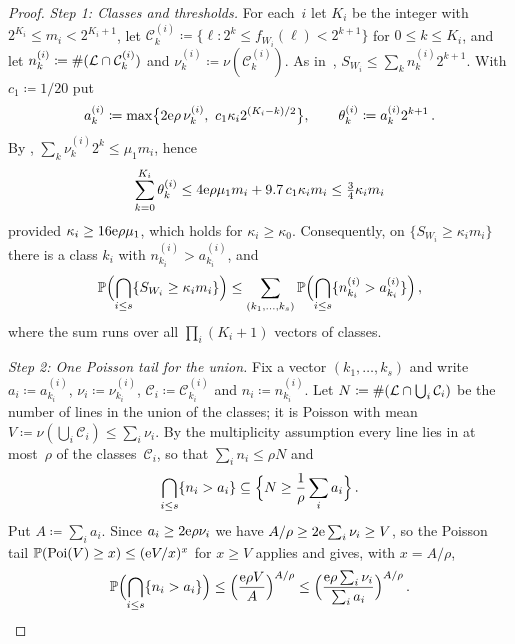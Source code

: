 \documentclass[11pt,letterpaper]{article}
\begin{document}
\begin{proof}
\emph{Step 1: Classes and thresholds.} For each~$i$ let $K_i$ be the integer with $2^{K_i}\le m_i<2^{K_i+1}$, let $\mathcal C^{(i)}_k\coloneqq\{\ell\colon2^k\le f_{W_i}(\ell)<2^{k+1}\}$ for $0\le k\le K_i$, and let $n^{(i)}_k\coloneqq\#(\cL\cap\mathcal C^{(i)}_k)$ and $\nu^{(i)}_k\coloneqq\nu(\mathcal C^{(i)}_k)$. As in~\cite[(2.2)]{SC26}, $S_{W_i}\le\sum_kn^{(i)}_k2^{k+1}$. With $c_1\coloneqq1/20$ put
\begin{equation}
\label{eq:thr}
  a^{(i)}_k\coloneqq\max\bigl\{2\e\rho\,\nu^{(i)}_k,\ c_1\kappa_i2^{(K_i-k)/2}\bigr\},\qquad\theta^{(i)}_k\coloneqq a^{(i)}_k2^{k+1}\,.
\end{equation}
By \cite[Lemma~2.2]{SC26}, $\sum_k\nu^{(i)}_k2^k\le\mu_1m_i$, hence
\begin{equation*}
  \sum_{k=0}^{K_i}\theta^{(i)}_k\le4\e\rho\mu_1m_i+9.7\,c_1\kappa_im_i\le\tfrac34\kappa_im_i
\end{equation*}
provided $\kappa_i\ge16\e\rho\mu_1$, which holds for $\kappa_i\ge\kappa_0$. Consequently, on $\{S_{W_i}\ge\kappa_im_i\}$ there is a class $k_i$ with $n^{(i)}_{k_i}>a^{(i)}_{k_i}$, and
\begin{equation}
\label{eq:vectorunion}
  \P\Bigl(\bigcap_{i\le s}\{S_{W_i}\ge\kappa_im_i\}\Bigr)\le\sum_{(k_1,\dots,k_s)}\P\Bigl(\bigcap_{i\le s}\{n^{(i)}_{k_i}>a^{(i)}_{k_i}\}\Bigr)\,,
\end{equation}
where the sum runs over all $\prod_i(K_i+1)$ vectors of classes.

\emph{Step 2: One Poisson tail for the union.} Fix a vector $(k_1,\dots,k_s)$ and write $a_i\coloneqq a^{(i)}_{k_i}$, $\nu_i\coloneqq\nu^{(i)}_{k_i}$, $\mathcal C_i\coloneqq\mathcal C^{(i)}_{k_i}$ and $n_i\coloneqq n^{(i)}_{k_i}$. Let $N\coloneqq\#(\cL\cap\bigcup_i\mathcal C_i)$ be the number of lines in the union of the classes; it is Poisson with mean $V\coloneqq\nu(\bigcup_i\mathcal C_i)\le\sum_i\nu_i$. By the multiplicity assumption every line lies in at most~$\rho$ of the classes~$\mathcal C_i$, so that $\sum_in_i\le\rho N$ and
\begin{equation*}
  \bigcap_{i\le s}\{n_i>a_i\}\subseteq\Bigl\{N\ge\frac1\rho\sum_ia_i\Bigr\}\,.
\end{equation*}
Put $A\coloneqq\sum_ia_i$. Since $a_i\ge2\e\rho\nu_i$ we have $A/\rho\ge2\e\sum_i\nu_i\ge V$, so the Poisson tail $\P(\mathrm{Poi}(V)\ge x)\le(\e V/x)^x$ for $x\ge V$ applies and gives, with $x=A/\rho$,
\begin{equation}
\label{eq:uniontail}
  \P\Bigl(\bigcap_{i\le s}\{n_i>a_i\}\Bigr)\le\Bigl(\frac{\e\rho V}{A}\Bigr)^{A/\rho}\le\Bigl(\frac{\e\rho\sum_i\nu_i}{\sum_ia_i}\Bigr)^{A/\rho}\,.
\end{equation}


\end{proof}
\end{document}
